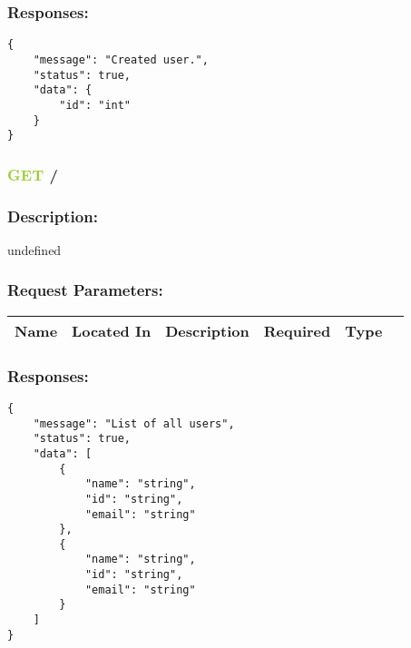 \documentclass{article}
\begin{document}
\subsubsection{Responses:}
  
\begin{lstlisting}[frame=single, title=\textbf{201}] 
{
    "message": "Created user.",
    "status": true,
    "data": {
        "id": "int"
    }
}
\end{lstlisting}
  
\subsubsection*{\textcolor{YellowGreen}{GET} /}
\subsubsection{Description:} 
undefined
 \subsubsection{Request Parameters:} 
 
\begin{tabular}{ | l | l | l | l | l | p{5cm} |} 
 \hline 
\textbf{Name} & \textbf{Located In} & \textbf{Description} & \textbf{Required} & \textbf{Type}\\ \hline 
\end{tabular} 
 
\subsubsection{Responses:}
  
\begin{lstlisting}[frame=single, title=\textbf{200}] 
{
    "message": "List of all users",
    "status": true,
    "data": [
        {
            "name": "string",
            "id": "string",
            "email": "string"
        },
        {
            "name": "string",
            "id": "string",
            "email": "string"
        }
    ]
}
\end{lstlisting}
  

 
\end{document}
